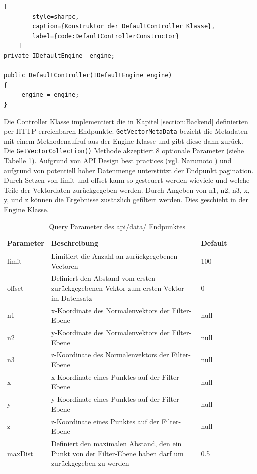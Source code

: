 \begin{codeblock}
	\begin{lstlisting}[
		style=sharpc,
		caption={Konstruktor der DefaultController Klasse},
		label={code:DefaultControllerConstructor}
	]
private IDefaultEngine _engine;

public DefaultController(IDefaultEngine engine)
{
	_engine = engine;
}
	\end{lstlisting}
\end{codeblock}

Die Controller Klasse implementiert die in Kapitel \ref{section:Backend}
definierten per HTTP erreichbaren Endpunkte. \texttt{GetVectorMetaData} bezieht die Metadaten mit einem
Methodenaufruf aus der Engine-Klasse und gibt diese dann zurück.
Die \texttt{GetVectorCollection()} Methode akzeptiert 8 optionale Parameter
(siehe Tabelle \ref{tab:EndpointQueryParameters}). Aufgrund von API
Design best practices (vgl. Narumoto \cite{ApiDesignBestPractices})
und aufgrund von potentiell hoher Datenmenge unterstützt der Endpunkt
pagination. Durch Setzen von limit und offset kann so gesteuert werden
wieviele und welche Teile der Vektordaten zurückgegeben werden.
Durch Angeben von n1, n2, n3, x, y, und z können die Ergebnisse
zusätzlich gefiltert werden. Dies geschieht in der Engine Klasse.

\begin{table}
	\centering
	\begin{tabular}[h]{p{0.11\linewidth} | p{0.7\linewidth}| p{0.09\linewidth}}
	Parameter & Beschreibung & Default \\
	\hline
	limit & Limitiert die Anzahl an zurückgegebenen Vectoren & 100\\
	offset & Definiert den Abstand vom ersten zurückgegebenen Vektor zum ersten Vektor im Datensatz & 0\\
	n1 & x-Koordinate des Normalenvektors der Filter-Ebene & null\\
	n2 & y-Koordinate des Normalenvektors der Filter-Ebene & null\\
	n3 & z-Koordinate des Normalenvektors der Filter-Ebene & null\\
	x & x-Koordinate eines Punktes auf der Filter-Ebene & null\\
	y & y-Koordinate eines Punktes auf der Filter-Ebene & null\\
	z & z-Koordinate eines Punktes auf der Filter-Ebene & null\\
	maxDist & Definiert den maximalen Abstand, den ein Punkt von der Filter-Ebene haben darf um zurückgegeben zu werden & 0.5\\
	\end{tabular}
	\caption{Query Parameter des api/data/ Endpunktes}
	\label{tab:EndpointQueryParameters}
\end{table}

